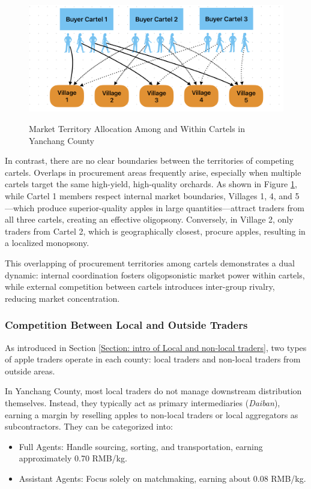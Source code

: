 \begin{figure}[hpt]
    \centering
        \caption{Market Territory Allocation Among and Within Cartels in Yanchang County}
    \includegraphics[width=\linewidth]{figures/Market_Territory.png}
    \label{fig: Market Territory}
\end{figure}

In contrast, there are no clear boundaries between the territories of competing cartels. Overlaps in procurement areas frequently arise, especially when multiple cartels target the same high-yield, high-quality orchards. As shown in Figure \ref{fig: Market Territory}, while Cartel 1 members respect internal market boundaries, Villages 1, 4, and 5---which produce superior-quality apples in large quantities---attract traders from all three cartels, creating an effective oligopsony. Conversely, in Village 2, only traders from Cartel 2, which is geographically closest, procure apples, resulting in a localized monopsony.

This overlapping of procurement territories among cartels demonstrates a dual dynamic: internal coordination fosters oligopsonistic market power within cartels, while external competition between cartels introduces inter-group rivalry, reducing market concentration. 



\subsubsection{Competition Between Local and Outside Traders}
\noindent 
As introduced in Section \ref{Section: intro of Local and non-local traders}, two types of apple traders operate in each county: local traders and non-local traders from outside areas.

In Yanchang County, most local traders do not manage downstream distribution themselves. Instead, they typically act as primary intermediaries (\textit{Daiban}), earning a margin by reselling apples to non-local traders or local aggregators as subcontractors. They can be categorized into:
\begin{itemize}
    \item Full Agents: Handle sourcing, sorting, and transportation, earning approximately 0.70 RMB/kg.
    \item Assistant Agents: Focus solely on matchmaking, earning about 0.08 RMB/kg.
\end{itemize}

